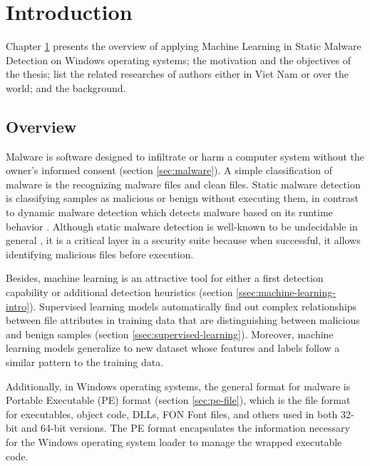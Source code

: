 
\chapter{Introduction}
\label{chap:introduction}
\graphicspath{{Chapter2/Figs/}}

\begin{chapabstract}
Chapter \ref{chap:introduction} presents the overview of applying Machine Learning in Static Malware Detection on Windows operating systems; the motivation and the objectives of the thesis; list the related researches of authors either in Viet Nam or over the world; and the background.
\end{chapabstract}

\section{Overview}
\label{sec:overview}

Malware is software designed to infiltrate or harm a computer system without the owner's informed consent (section \ref{sec:malware}). A simple classification of malware is the recognizing malware files and clean files. Static malware detection is classifying samples as malicious or benign without executing them, in contrast to dynamic malware detection which detects malware based on its runtime behavior \cite{athiwaratkun2017malware, dahl2013large}. Although static malware detection is well-known to be undecidable in general \cite{cohen1987computer}, it is a critical layer in a security suite because when successful, it allows identifying malicious files before execution.

Besides, machine learning is an attractive tool for either a first detection capability or additional detection heuristics (section \ref{ssec:machine-learning-intro}). Supervised learning models automatically find out complex relationships between file attributes in training data that are distinguishing between malicious and benign samples (section \ref{ssec:supervised-learning}). Moreover, machine learning models generalize to new dataset whose features and labels follow a similar pattern to the training data. 

Additionally, in Windows operating systems, the general format for malware is Portable Executable (PE) format (section \ref{sec:pe-file}), which is the file format for executables, object code, DLLs, FON Font files, and others used in both 32-bit and 64-bit versions. The PE format encapsulates the information necessary for the Windows operating system loader to manage the wrapped executable code.

